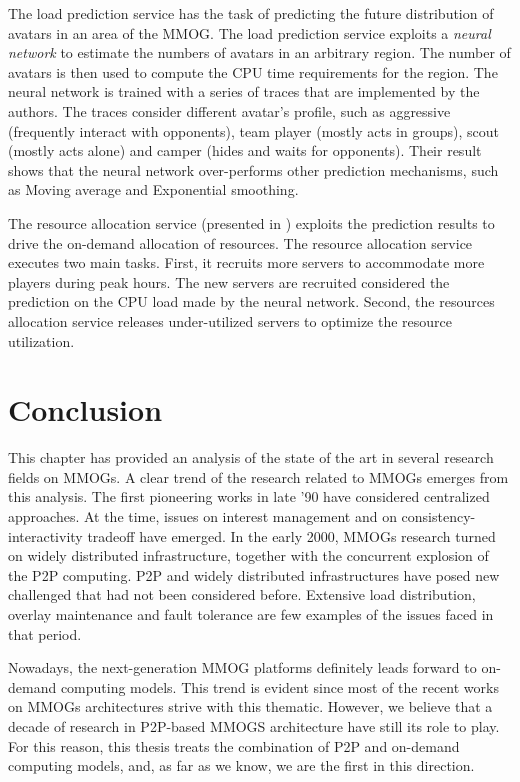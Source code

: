 \documentclass[final,10pt,a5paper]{phdimt}
\theoremstyle{definition}
\begin{document}
The load prediction service has the task of predicting the future distribution of avatars in an area of the MMOG. 
The load prediction service exploits a \textit{neural network} to estimate the numbers of avatars in an arbitrary region.
The number of avatars is then used to compute the CPU time requirements for the region.
The neural network is trained with a series of traces that are implemented by the authors.
The traces consider different avatar's profile, such as aggressive (frequently interact with opponents), team player (mostly acts in groups), scout (mostly acts alone) and camper (hides and waits for opponents). Their result shows that the neural network over-performs other prediction mechanisms, such as Moving average and Exponential smoothing.


The resource allocation service (presented in \cite{Nae2008}) exploits the prediction results to drive the on-demand allocation of resources. The resource allocation service executes two main tasks.
First, it recruits more servers to accommodate more players during peak hours. 
The new servers are recruited considered the prediction on the CPU load made by the neural network.
Second, the resources allocation service releases under-utilized servers to optimize the resource utilization.






\section{Conclusion}
\label{related-conc}

This chapter has provided an analysis of the state of the art in several research fields on MMOGs.
A clear trend of the research related to MMOGs emerges from this analysis.
The first pioneering works in late '90 have considered centralized approaches.
At the time, issues on interest management and on consistency-interactivity tradeoff have emerged.
In the early 2000, MMOGs research turned on widely distributed infrastructure, together with the concurrent explosion of the P2P computing. P2P and widely distributed infrastructures have posed new challenged that had not been considered before.
Extensive load distribution, overlay maintenance and fault tolerance are few examples of the issues faced in that period.


Nowadays, the next-generation MMOG platforms definitely leads forward to on-demand computing models.
This trend is evident since most of the recent works on MMOGs architectures strive with this thematic. 
However, we believe that a decade of research in P2P-based MMOGS architecture have still its role to play. 
For this reason, this thesis treats the combination of P2P and on-demand computing models, and, as far as we know, we are the first in this direction.
\end{document}
